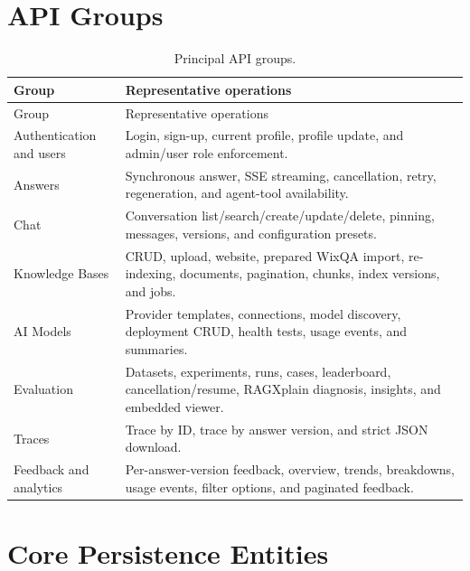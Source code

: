 
\section{API Groups}

\begin{longtable}{p{}p{}}
  \caption{Principal API groups.}
  \label{tab:api-groups}\\
  \toprule
  Group & Representative operations\\
  \midrule
  \endfirsthead
  \toprule
  Group & Representative operations\\
  \midrule
  \endhead
  Authentication and users &
  Login, sign-up, current profile, profile update, and admin/user role
  enforcement.\\
  Answers &
  Synchronous answer, SSE streaming, cancellation, retry, regeneration, and
  agent-tool availability.\\
  Chat &
  Conversation list/search/create/update/delete, pinning, messages, versions,
  and configuration presets.\\
  Knowledge Bases &
  CRUD, upload, website, prepared WixQA import, re-indexing, documents,
  pagination, chunks, index versions, and jobs.\\
  AI Models &
  Provider templates, connections, model discovery, deployment CRUD, health
  tests, usage events, and summaries.\\
  Evaluation &
  Datasets, experiments, runs, cases, leaderboard, cancellation/resume,
  RAGXplain diagnosis, insights, and embedded viewer.\\
  Traces &
  Trace by ID, trace by answer version, and strict JSON download.\\
  Feedback and analytics &
  Per-answer-version feedback, overview, trends, breakdowns, usage events,
  filter options, and paginated feedback.\\
  \bottomrule
\end{longtable}

\section{Core Persistence Entities}

